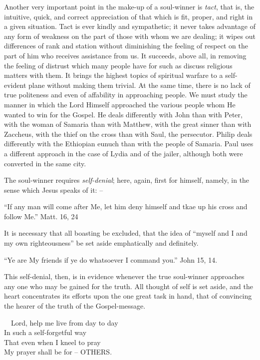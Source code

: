 \documentclass[
]{book}
\begin{document}
Another very important point in the make-up of a soul-winner is \emph{tact}, that is, the intuitive, quick, and correct appreciation of that which is fit, proper, and right in a given situation. Tact is ever kindly and sympathetic; it never takes advantage of any form of weakness on the part of those with whom we are dealing; it wipes out differences of rank and station without diminishing the feeling of respect on the part of him who receives assistance from us. It succeeds, above all, in removing the feeling of distrust which many people have for such as discuss religious matters with them. It brings the highest topics of spiritual warfare to a self-evident plane without making them trivial. At the same time, there is no lack of true politeness and even of affability in approaching people. We must study the manner in which the Lord Himself approached the various people whom He wanted to win for the Gospel. He deals differently with John than with Peter, with the woman of Samaria than with Matthew, with the great sinner than with Zaccheus, with the thief on the cross than with Saul, the persecutor. Philip deals differently with the Ethiopian eunuch than with the people of Samaria. Paul uses a different approach in the case of Lydia and of the jailer, although both were converted in the same city.

The soul-winner requires \emph{self-denial}; here, again, first for himself, namely, in the sense which Jesus speaks of it: --

``If any man will come after Me, let him deny himself and tkae up his cross and follow Me.'' Matt. 16, 24

It is necessary that all boasting be excluded, that the idea of ``myself and I and my own righteousness'' be set aside emphatically and definitely.

``Ye are My friends if ye do whatsoever I command you.'' John 15, 14.

This self-denial, then, is in evidence whenever the true soul-winner approaches any one who may be gained for the truth. All thought of self is set aside, and the heart concentrates its efforts upon the one great task in hand, that of convincing the hearer of the truth of the Gospel-message.

~~Lord, help me live from day to day\\
\hspace*{0.333em}\hspace*{0.333em}In such a self-forgetful way\\
\hspace*{0.333em}\hspace*{0.333em}That even when I kneel to pray\\
\hspace*{0.333em}\hspace*{0.333em}My prayer shall be for -- OTHERS.
\end{document}
